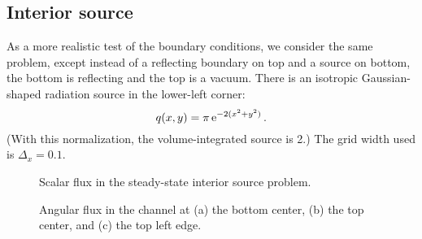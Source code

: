 \subsection{Interior source}

As a more realistic test of the boundary conditions, we consider the same
problem, except instead of a reflecting boundary on top and a source on bottom,
the bottom is reflecting and the top is a vacuum. There is an isotropic
Gaussian-shaped radiation source in the lower-left corner:
\begin{equation*}
  q(x,y) = \pi \mathop{}\!\mathrm{e}^{-2 (x^2 + y^2) } \,.
\end{equation*}
(With this normalization, the volume-integrated source is 2.)
The grid width used is $\Delta_x = 0.1$.

\begin{figure}[tb]
  \centering
  \hspace{-.25in}%
  
  \caption{Scalar flux in the steady-state interior source problem.}
  \label{fig:bcReactorFlux}
\end{figure}

\begin{figure}[htb]
  \centering\small

  \hspace{-.75in}
  \hspace{-.5in}%
  \hspace{-.75in}
  \caption{Angular flux in the channel at (a) the bottom center, (b) the top
  center, and (c) the top left edge.}
  \label{fig:bcReactor}
\end{figure}

